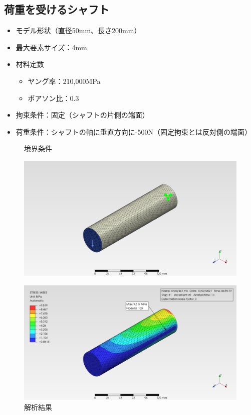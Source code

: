 \documentclass[a4j,20pt,slide]{ltjsarticle}
\begin{document}
\subsection{荷重を受けるシャフト}
\begin{itemize}
	\item モデル形状（直径50mm、長さ200mm）
	\item 最大要素サイズ：4mm
	\item 材料定数
	      \begin{itemize}
		      \item ヤング率：210,000MPa
		      \item ポアソン比：0.3
	      \end{itemize}
	\item 拘束条件：固定（シャフトの片側の端面）
	\item 荷重条件：シャフトの軸に垂直方向に-500N（固定拘束とは反対側の端面）
\end{itemize}
\vspace{-\baselineskip}
\begin{figure}[H]
	\begin{minipage}{.49\hsize}
		\caption{境界条件}
		\label{02-01}
		\centering
		\includegraphics[width=.95\columnwidth]{fig/02-01.png}
	\end{minipage}
	\begin{minipage}{.49\hsize}
		\caption{解析結果}
		\label{02-02}
		\centering
		\includegraphics[width=.95\columnwidth]{fig/02-02.png}
	\end{minipage}
\end{figure}
\clearpage
%
\end{document}
